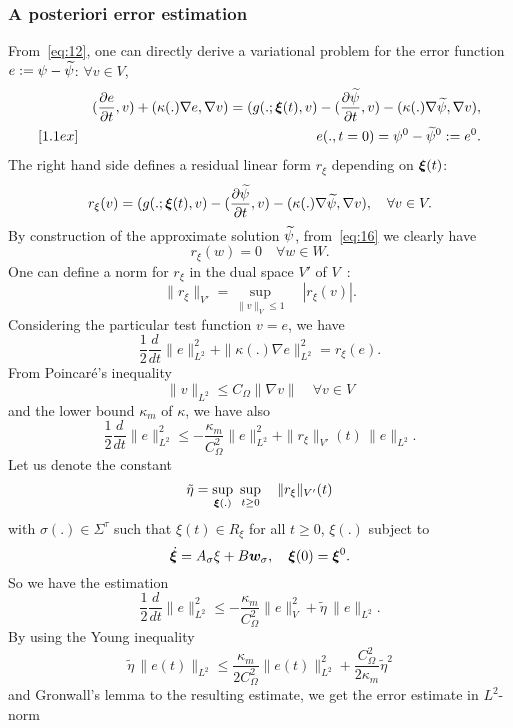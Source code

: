 \subsubsection{A posteriori error estimation}
%
From~\eqref{eq:12}, one can directly derive a variational problem for the
error function $e:=\psi-\widetilde\psi$: $\forall v \in V$,
%
\begin{eqnarray}
&& (\frac{\partial  e}{\partial t},v) + (\kappa(.)\nabla e,\nabla v)
= (g(.;\bm{\xi}(t),v)-(\frac{\partial \widetilde\psi}{\partial t},v) 
-(\kappa(.)\nabla\widetilde\psi,\nabla v)
 , \label{eq:16} \\ [1.1ex]
&& e(.,t=0) = \psi^0-\widetilde\psi^0 :=e^0.
\end{eqnarray}
%
The right hand side defines a residual linear form $r_\xi$ depending on $\bm{\xi}(t)$:
%
\begin{equation}
r_\xi(v) = (g(.;\bm{\xi}(t),v)-(\frac{\partial \widetilde\psi}{\partial t},v) 
-(\kappa(.)\nabla\widetilde\psi,\nabla v),\quad \forall v\in V.
\end{equation}
%
By construction of the approximate solution $\widetilde\psi$, from~\eqref{eq:16} we clearly have
\[
r_\xi(w) = 0 \quad \forall w\in W.
\]
%
One can define a norm for $r_\xi$ in the dual space $V'$ of $V$~:
\[
\|r_\xi\|_{V'} = \sup_{\|v\|_V \leq 1} \quad |r_\xi(v)|.
\]
%
Considering the particular test function $v=e$, we have
\[
\frac{1}{2}\frac{d}{dt}\|e\|_{L^2}^2 + \|\kappa(.)\nabla e\|_{L^2}^2 = r_\xi(e).
\]
From Poincar\'e's inequality 
\[
\|v\|_{L^2} \leq C_\Omega \|\nabla v\| \quad \forall v\in V
\]
and the lower bound $\kappa_m$ of $\kappa$, we have also 
\[
\frac{1}{2}\frac{d}{dt}\|e\|_{L^2}^2 \leq -\frac{\kappa_m}{C_\Omega^2}\|e\|_{L^2}^2 + \|r_\xi\|_{V'}(t)\, \|e\|_{L^2}.
\]
Let us denote the constant
%
\begin{equation}
\tilde \eta = \sup_{\bm{\xi}(.)}\ \sup_{t\geq 0}\quad \|r_\xi\|_{V'}(t)
\label{eq:eta}
\end{equation}
%
with $\sigma(.)\in \Sigma^\tau$ such that $\xi(t)\in  R_\xi$ for all $t\geq 0$, $\xi(.)$ subject to
\[
\dot {\bm{\xi}} = A_\sigma \xi + B\bm{w}_\sigma,\quad \bm{\xi}(0)=\bm{\xi}^0.
\]
So we have the estimation
%
\begin{equation}
\frac{1}{2}\frac{d}{dt}\|e\|_{L^2}^2 \leq -\frac{\kappa_m}{C_\Omega^2} \|e\|_V^2 + \tilde\eta\, \|e\|_{L^2}.
\label{eq:22}
\end{equation}
%
By using the Young inequality 
\[
\tilde\eta\, \|e(t)\|_{L^2} \leq \frac{\kappa_m}{2C_\Omega^2}\|e(t)\|_{L^2}^2
+\frac{C_\Omega^2}{2\kappa_m}\tilde\eta^2
\]
and Gronwall's lemma to the resulting estimate, we get the error estimate in $L^2$-norm
